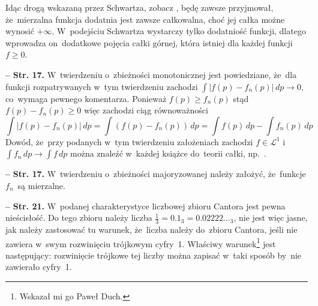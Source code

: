 \documentclass[a4paper,11pt]{article}
\newcommand{\spaceThree}{0.5em}
\newcommand{\ld}{\ldots}
\newcommand{\fr}{\frac}
\newcommand{\mc}{\mathcal}
\newcommand{\ra}{\rightarrow}
\newcommand{\Lc}{\mc{L}}
\newcommand{\dk}{\, d} %
\newcommand{\Int}{\int\limits}
\newcommand{\IntCaD}[2] { \Int #1 \, d#2 } %
\newcommand{\LIj}{\Lc^{ 1 }}
\newcommand{\tb}{\textbf}
\newcommand{\noi}{\noindent}
\newcommand{\start}{\noi \tb{--} {}}
\newcommand{\Str}[1]{\tb{Str. #1.}}
\begin{document}
Idąc drogą wskazaną przez Schwartza, zobacz \cite{Schwartz79}, będę
zawsze przyjmował, że~mierzalna funkcja dodatnia jest zawsze
całkowalna, choć jej całka możne wynosić $+\infty$. W~podejściu
Schwartza wystarczy tylko dodatniość funkcji, dlatego wprowadza
on~dodatkowe pojęcia całki górnej, która istniej dla każdej funkcji
$f \geq 0$. %


\vspace{\spaceThree}


\start \Str{17} W~twierdzeniu o~zbieżności monotonicznej jest
powiedziane, że~dla funkcji rozpatrywanych w~tym twierdzeniu zachodzi
$\int | f( p ) - f_{ n }( p ) | \dk p \ra 0$, co~wymaga pewnego
komentarza. Ponieważ $f( p ) \geq f_{ n }( p )$ stąd
$f( p ) - f_{ n }( p ) \geq 0$ więc zachodzi ciąg równoważności
\begin{equation*}
  \IntCaD{ | f( p ) - f_{ n }( p ) | }{ p } = \IntCaD{ ( f( p )
    - f_{ n }( p ) ) }{ p } = \IntCaD{ f( p ) }{ p }
  - \IntCaD{ f_{ n }( p ) }{ p }
\end{equation*}
Dowód, że~przy podanych w~tym twierdzeniu założeniach zachodzi
$f \in \LIj$ i~$\IntCaD{ f_{ n } }{ p } \ra \IntCaD{ f }{ p }$ można
znaleźć w~każdej książce do~teorii całki,
np.~\cite{Rudin98}. %

\vspace{\spaceThree}


\start \Str{17} W~twierdzeniu o~zbieżności majoryzowanej należy
założyć, że~funkcje $f_{ n }$~są mierzalne. %


\start \Str{21} W~podanej charakterystyce liczbowej zbioru Cantora
jest pewna nieścisłość. Do tego zbioru należy liczba
$\fr{ 1 }{ 3 } = 0.1_{ 3 } = 0.02222\ld_{ 3 }$, nie jest więc jasne,
jak należy zastosować tu warunek, że~liczba należy do~zbioru Cantora,
jeśli nie zawiera w~swym rozwinięciu trójkowym cyfry~1. Właściwy
warunek\footnote{Wskazał mi go Paweł Duch.} jest następujący:
rozwinięcie trójkowe tej liczby można zapisać w~taki sposób by~nie
zawierało cyfry~1. %
\end{document}

